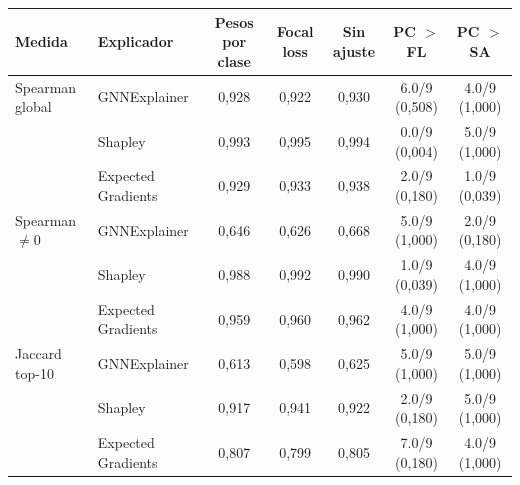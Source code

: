 \begin{tabular}{llccccc}
\toprule
Medida & Explicador & Pesos por clase & Focal loss & Sin ajuste & PC $>$ FL & PC $>$ SA \\
\midrule
Spearman global & GNNExplainer & 0{,}928 & 0{,}922 & 0{,}930 & 6.0/9 (0{,}508) & 4.0/9 (1{,}000) \\
 & Shapley & 0{,}993 & 0{,}995 & 0{,}994 & 0.0/9 (0{,}004) & 5.0/9 (1{,}000) \\
 & Expected Gradients & 0{,}929 & 0{,}933 & 0{,}938 & 2.0/9 (0{,}180) & 1.0/9 (0{,}039) \\
\midrule
Spearman $\neq 0$ & GNNExplainer & 0{,}646 & 0{,}626 & 0{,}668 & 5.0/9 (1{,}000) & 2.0/9 (0{,}180) \\
 & Shapley & 0{,}988 & 0{,}992 & 0{,}990 & 1.0/9 (0{,}039) & 4.0/9 (1{,}000) \\
 & Expected Gradients & 0{,}959 & 0{,}960 & 0{,}962 & 4.0/9 (1{,}000) & 4.0/9 (1{,}000) \\
\midrule
Jaccard top-10 & GNNExplainer & 0{,}613 & 0{,}598 & 0{,}625 & 5.0/9 (1{,}000) & 5.0/9 (1{,}000) \\
 & Shapley & 0{,}917 & 0{,}941 & 0{,}922 & 2.0/9 (0{,}180) & 5.0/9 (1{,}000) \\
 & Expected Gradients & 0{,}807 & 0{,}799 & 0{,}805 & 7.0/9 (0{,}180) & 4.0/9 (1{,}000) \\
\bottomrule
\end{tabular}
